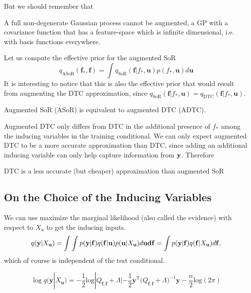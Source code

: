 \documentclass[10pt]{elegantbook}
\begin{document}
But we should remember that

\begin{remark}
    A full non-degenerate Gaussian process cannot be augmented, a GP with a covariance function that has a
feature-space which is infinite dimensional, i.e. with basis functions everywhere.
\end{remark}

Let us compute the effective prior for the augmented SoR
\begin{equation}
    q_{\mathrm{ASoR}}(\mathbf{f}_{*},\mathbf{f})=\int q_{\mathrm{SoR}}(\mathbf{f}|f_{*},\mathbf{u})p(f_{*},\mathbf{u})d\mathbf{u}
\end{equation}
It is interesting to notice that this is also the effective prior that would result from augmenting the
DTC approximation, since $q_{\mathrm{SoR}}(\mathbf{f}|f_{*},\mathbf{u}) = q_{\mathrm{DTC}}(\mathbf{f}|f_{*},\mathbf{u})$.

\begin{remark}
    Augmented SoR (ASoR) is equivalent to augmented DTC (ADTC).
\end{remark}

Augmented DTC only differs from DTC in the additional presence of $f_*$ among the inducing variables in the training conditional. We can only expect 
augmented DTC to be a more accurate approximation than DTC, since adding an additional inducing variable can only help capture information
from $\bf y$. Therefore

\begin{remark}
    DTC is a less accurate (but cheaper) approximation than augmented SoR
\end{remark}

\subsection{On the Choice of the Inducing Variables}
We can use maximize the marginal
likelihood (also called the evidence) with respect to $X_u$ to get the inducing inputs.
\begin{equation}
    q({\bf y}|X_{\mathbf{u}})
    =\int \int p({\bf y}|{\bf f})q({\bf f}|{\bf u})p({\bf u}|X_{\mathbf{u}}) d{\bf u}\mathbf{d}{\bf f}=\int p({\bf y}|{\bf f})q({\bf f}|X_{\mathbf{u}})d{\bf f},
\end{equation}
which of course is independent of the test conditional. 

\begin{equation}
    \log q(\mathbf{y}|X_{\mathbf{u}})
    =-{\frac{1}{2}}\mathrm{log}|Q_{\mathbf{f,f}}+\Lambda|
    -{\textstyle\frac{1}{2}}\mathbf{y}^{\mathsf{T}}{\big(}Q_{\mathbf{f,f}}+\Lambda\big)^{-1}\mathbf{y}-{\textstyle\frac{n}{2}}\mathrm{log}(2\pi)
\end{equation}
\end{document}

